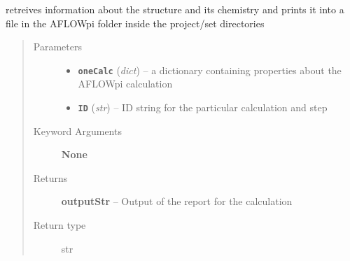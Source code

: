 \documentclass[letterpaper,10pt,english]{sphinxmanual}
\begin{document}
\begin{fulllineitems}
\label{retr:retr.getCellOutput}
retreives information about the structure and its chemistry and prints
it into a file in the AFLOWpi folder inside the project/set directories
\begin{quote}\begin{description}
\item[{Parameters}] \leavevmode\begin{itemize}
\item {} 
\textbf{\texttt{oneCalc}} (\emph{dict}) -- a dictionary containing properties about the AFLOWpi calculation

\item {} 
\textbf{\texttt{ID}} (\emph{str}) -- ID string for the particular calculation and step

\end{itemize}

\item[{Keyword Arguments}] \leavevmode
\textbf{None}

\item[{Returns}] \leavevmode
\textbf{outputStr} --
Output of the report for the calculation

\item[{Return type}] \leavevmode
str

\end{description}\end{quote}

\end{fulllineitems}

\end{document}
